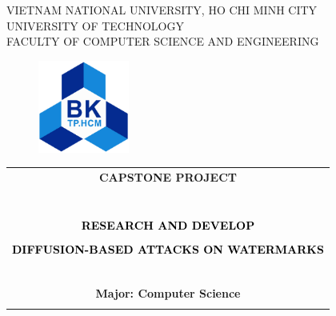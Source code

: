 \documentclass[a4paper]{report}
\begin{document}
\begin{titlepage}
  \begin{center}
    VIETNAM NATIONAL UNIVERSITY, HO CHI MINH CITY\\
    UNIVERSITY OF TECHNOLOGY\\
    FACULTY OF COMPUTER SCIENCE AND ENGINEERING
  \end{center}

  \vspace{1cm}

  \begin{figure}[ht]
    \centering
    \includegraphics[width=3cm]{hcmut.png}
  \end{figure}

  \vspace{1cm}

  \begin{center}
    \begin{tabular}{c}
      \multicolumn{1}{c}{\textbf{{\Large  CAPSTONE PROJECT}}}                    \\ \\
      ~~                                                                         \\
      \hline
      \\

      \textcolor{black}{\textbf{{\Large RESEARCH AND DEVELOP}}}                  \\\\
      \textcolor{black}{\textbf{{\Large DIFFUSION-BASED ATTACKS ON WATERMARKS}}} \\
      ~~                                                                         \\
      \hline
      \\
      \textbf{{\fontsize{12pt}{1.5pt} \selectfont Major: Computer Science}}      \\[2mm]
      \\
    \end{tabular}
  \end{center}


\end{titlepage}
\end{document}
